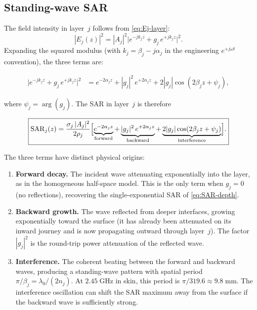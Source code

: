\subsection{Standing-wave SAR}
\label{sec:standing-wave}

The field intensity in layer~$j$ follows from \cref{eq:Ej-layer}:
\begin{equation}\label{eq:E2-layer}
  |E_j(z)|^2
  = |A_j|^2\bigl|e^{-jk_j z} + g_j\,e^{+jk_j z}\bigr|^2.
\end{equation}
Expanding the squared modulus (with $k_j = \beta_j - j\alpha_j$ in the
engineering $e^{+j\omega t}$ convention), the three terms are:

\begin{align}
  \bigl|e^{-jk_j z} + g_j\,e^{+jk_j z}\bigr|^2
  &= e^{-2\alpha_j z}
   + |g_j|^2\,e^{+2\alpha_j z}
   + 2|g_j|\cos(2\beta_j z + \psi_j),
   \label{eq:E2-three-terms}
\end{align}

\noindent
where $\psi_j = \arg(g_j)$.  The SAR in layer~$j$ is therefore

\begin{equation}\label{eq:SAR-standing}
  \boxed{%
  \SAR_j(z)
  = \frac{\sigma_j\,|A_j|^2}{2\rho_j}
    \Bigl[
      \underbrace{e^{-2\alpha_j z}}_{\text{forward}}
    + \underbrace{|g_j|^2\,e^{+2\alpha_j z}}_{\text{backward}}
    + \underbrace{2|g_j|\cos(2\beta_j z + \psi_j)}_{\text{interference}}
    \Bigr].
  }
\end{equation}

\noindent
The three terms have distinct physical origins:

\begin{enumerate}[nosep]
\item \textbf{Forward decay.}  The incident wave attenuating
  exponentially into the layer, as in the homogeneous half-space model.
  This is the only term when $g_j = 0$ (no reflections), recovering
  the single-exponential SAR of \cref{eq:SAR-depth}.

\item \textbf{Backward growth.}  The wave reflected from deeper
  interfaces, growing exponentially toward the surface (it has
  already been attenuated on its inward journey and is now propagating
  outward through layer~$j$).  The factor $|g_j|^2$ is the round-trip
  power attenuation of the reflected wave.

\item \textbf{Interference.}  The coherent beating between the forward
  and backward waves, producing a standing-wave pattern with spatial
  period $\pi/\beta_j = \lambda_0/(2n_j)$.  At $2.45\;\mathrm{GHz}$ in
  skin, this period is $\pi/319.6 \approx 9.8\;\mathrm{mm}$.  The
  interference oscillation can shift the SAR maximum away from the
  surface if the backward wave is sufficiently strong.
\end{enumerate}

